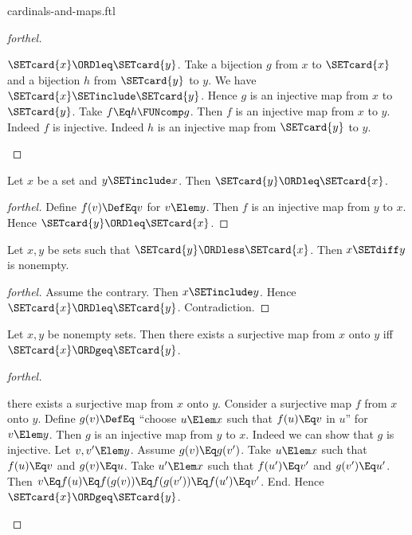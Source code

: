 \documentclass{stex}
\begin{document}
\begin{smodule}{cardinals-and-maps.ftl}
\begin{proof}[forthel]
  \begin{case}{$\SETcard{x} \ORDleq \SETcard{y}$.}
    Take a bijection $g$ from $x$ to $\SETcard{x}$ and a bijection $h$ from $\SETcard{y}$ to $y$.
    We have $\SETcard{x} \SETinclude \SETcard{y}$.
    Hence $g$ is an injective map from $x$ to $\SETcard{y}$.
    Take $f \Eq h \FUNcomp g$.
    Then $f$ is an injective map from $x$ to $y$.
    Indeed $f$ is injective.
    Indeed $h$ is an injective map from $\SETcard{y}$ to $y$.
  \end{case}
\end{proof}

\begin{corollary}[forthel]
  Let $x$ be a set and $y \SETinclude x$.
  Then $\SETcard{y} \ORDleq \SETcard{x}$.
\end{corollary}
\begin{proof}[forthel]
  Define $f(v) \DefEq v$ for $v \Elem y$.
  Then $f$ is an injective map from $y$ to $x$.
  Hence $\SETcard{y} \ORDleq \SETcard{x}$.
\end{proof}

\begin{corollary}[forthel]
  Let $x, y$ be sets such that $\SETcard{y} \ORDless \SETcard{x}$.
  Then $x \SETdiff y$ is nonempty.
\end{corollary}
\begin{proof}[forthel]
  Assume the contrary.
  Then $x \SETinclude y$.
  Hence $\SETcard{x} \ORDleq \SETcard{y}$.
  Contradiction.
\end{proof}


\begin{proposition}[forthel,name=existence condition for surjections]
  Let $x, y$ be nonempty sets.
  Then there exists a surjective map from $x$ onto $y$ iff $\SETcard{x} \ORDgeq \SETcard{y}$.
\end{proposition}
\begin{proof}[forthel]
  \begin{case}{there exists a surjective map from $x$ onto $y$.}
    Consider a surjective map $f$ from $x$ onto $y$.
    Define $g(v) \DefEq$ ``choose $u \Elem x$ such that $f(u) \Eq v$ in $u$'' for $v \Elem y$.
    Then $g$ is an injective map from $y$ to $x$.
    Indeed we can show that $g$ is injective.
      Let $v, v' \Elem y$.
      Assume $g(v) \Eq g(v')$.
      Take $u \Elem x$ such that $f(u) \Eq v$ and $g(v) \Eq u$.
      Take $u' \Elem x$ such that $f(u') \Eq v'$ and $g(v') \Eq u'$.
      Then $v
        \Eq f(u)
        \Eq f(g(v))
        \Eq f(g(v'))
        \Eq f(u')
        \Eq v'$.
    End.
    Hence $\SETcard{x} \ORDgeq \SETcard{y}$.
  \end{case}


\end{proof}
\end{smodule}
\end{document}
